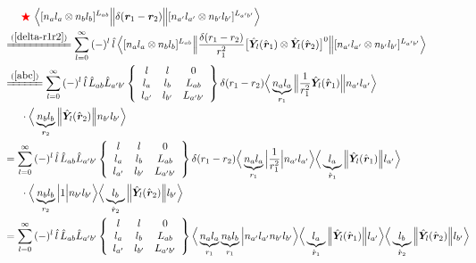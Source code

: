 \documentclass[master]{shnuthesis}
\newcommand{\bmr}{\textbf{\textit{r}}}
\newcommand{\ap}{a^\prime}
\newcommand{\bp}{b^\prime}
\newcommand{\il}{\!\!\!\!\!\!\!\!\!\!}
\newcommand{\zdydh}{\xlongequal}
\newcommand{\redstar}{{\color{red} \bigstar}\,\,}
\begin{document}
\begin{align}
    & \redstar \Big\langle [n_a l_a \otimes n_b l_b]^{L_{ab}} \Big\| \delta(\bmr_1-\bmr_2) \Big\| [n_{\ap} l_{\ap} \otimes n_{\bp} l_{\bp}]^{L_{\ap\bp}} \Big\rangle \notag\\
    &\il \zdydh{(\ref{delta-r1r2})} \sum_{l=0}^\infty \,(-)^l\,\hat{l}\, \Big\langle [n_a l_a \otimes n_b l_b]^{L_{ab}} \Big\| \frac{\delta(r_1-r_2)}{r_1^2}\big[\hat{\bm{Y}}_l(\hat{\bmr}_1) \otimes \hat{\bm{Y}}_l(\hat{\bmr}_2)\big]^0 \Big\| [n_{\ap} l_{\ap} \otimes n_{\bp} l_{\bp}]^{L_{\ap\bp}} \Big\rangle \\
    &\il \zdydh{(\ref{abc})} \sum_{l=0}^\infty \,(-)^l\,\hat{l}\,\hat{L}_{ab}\hat{L}_{\ap\bp}  \left\{\begin{array}{ccc} l & l & 0 \\ l_a & l_b & L_{ab} \\ l_{\ap} & l_{\bp} & L_{\ap\bp} \end{array}\right\}  \delta(r_1-r_2) \Big\langle \underbrace{n_a l_a}_{\bmr_1} \Big\| \frac{1}{r_1^2}\hat{\bm{Y}}_l(\hat{\bmr}_1) \Big\| n_{\ap} l_{\ap} \Big\rangle \notag\\
    & \cdot \Big\langle \underbrace{n_b l_b}_{\bmr_2} \Big\| \hat{\bm{Y}}_l(\hat{\bmr}_2) \Big\| n_{\bp} l_{\bp} \Big\rangle \\
    &\il = \sum_{l=0}^\infty \,(-)^l\,\hat{l}\,\hat{L}_{ab}\hat{L}_{\ap\bp}  \left\{\begin{array}{ccc} l & l & 0 \\ l_a & l_b & L_{ab} \\ l_{\ap} & l_{\bp} & L_{\ap\bp} \end{array}\right\}  \delta(r_1-r_2) \Big\langle \underbrace{n_a l_a}_{r_1} \Big| \frac{1}{r_1^2} \Big| n_{\ap} l_{\ap} \Big\rangle  \Big\langle \underbrace{l_a}_{\hat{\bmr}_1} \Big\| \hat{\bm{Y}}_l(\hat{\bmr}_1) \Big\| l_{\ap} \Big\rangle \notag\\
    & \cdot \Big\langle \underbrace{n_b l_b}_{r_2} \Big| 1 \Big| n_{\bp} l_{\bp} \Big\rangle  \Big\langle \underbrace{l_b}_{\hat{\bmr}_2} \Big\| \hat{\bm{Y}}_l(\hat{\bmr}_2) \Big\| l_{\bp} \Big\rangle \\
    &\il = \sum_{l=0}^\infty \,(-)^l\,\hat{l}\,\hat{L}_{ab}\hat{L}_{\ap\bp}  \left\{\begin{array}{ccc} l & l & 0 \\ l_a & l_b & L_{ab} \\ l_{\ap} & l_{\bp} & L_{\ap\bp} \end{array}\right\}  \Big\langle \underbrace{n_a l_a}_{r_1} \underbrace{n_b l_b}_{r_1} \Big| n_{\ap} l_{\ap} n_{\bp} l_{\bp} \Big\rangle  \Big\langle \underbrace{l_a}_{\hat{\bmr}_1} \Big\| \hat{\bm{Y}}_l(\hat{\bmr}_1) \Big\| l_{\ap} \Big\rangle \Big\langle \underbrace{l_b}_{\hat{\bmr}_2} \Big\| \hat{\bm{Y}}_l(\hat{\bmr}_2) \Big\| l_{\bp} \Big\rangle \\

\end{align}
\end{document}
